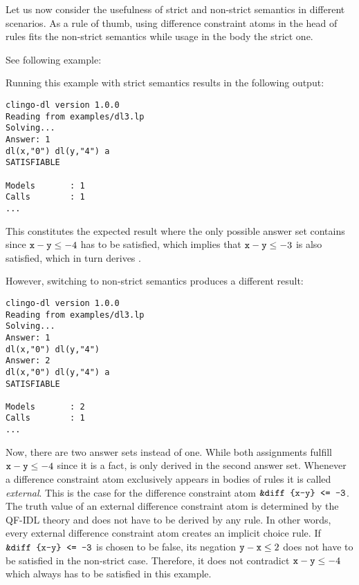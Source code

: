 Let us now consider the usefulness of strict and non-strict semantics in different scenarios.
As a rule of thumb, using difference constraint atoms in the head of rules fits the non-strict semantics 
while usage in the body the strict one.

\begin{example}\label{ex:dl:se}
See following example:

Running this example with strict semantics results in the following output:

\begin{lstlisting}[numbers=none]
clingo-dl version 1.0.0
Reading from examples/dl3.lp
Solving...
Answer: 1
dl(x,"0") dl(y,"4") a
SATISFIABLE

Models       : 1
Calls        : 1
...
\end{lstlisting}

This constitutes the expected result 
where the only possible answer set contains  since $\texttt{x}-\texttt{y}\leq-4$
has to be satisfied, which implies that $\texttt{x}-\texttt{y}\leq-3$ is also satisfied,
which in turn derives .

However, switching to non-strict semantics produces a different result:

\begin{lstlisting}[numbers=none]
clingo-dl version 1.0.0
Reading from examples/dl3.lp
Solving...
Answer: 1
dl(x,"0") dl(y,"4")
Answer: 2
dl(x,"0") dl(y,"4") a
SATISFIABLE

Models       : 2
Calls        : 1
...
\end{lstlisting}

Now, there are two answer sets instead of one. 
While both assignments fulfill $\texttt{x}-\texttt{y}\leq-4$ since it is a fact,
 is only derived in the second answer set.
Whenever a difference constraint atom exclusively appears in bodies of rules it is called \emph{external}.
This is the case for the difference constraint atom $\texttt{\&diff\text{ }\{x-y\}\text{ }<=\text{ }-3}$.
The truth value of an external difference constraint atom is determined by the QF-IDL theory and does not have to be derived by any rule.
In other words, every external difference constraint atom creates an implicit choice rule.
If $\texttt{\&diff\text{ }\{x-y\}\text{ }<=\text{ }-3}$ is chosen to be false, 
its negation $\texttt{y}-\texttt{x}\leq 2$ does not have to be satisfied in the non-strict case.
Therefore, it does not contradict $\texttt{x}-\texttt{y}\leq -4$ which always has to be satisfied in this example.

\end{example}

